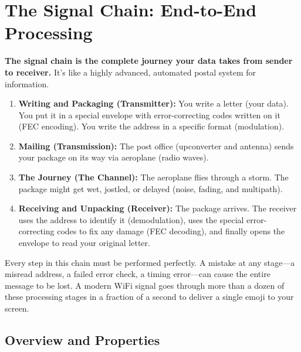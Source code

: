 
\chapter{The Signal Chain: End-to-End Processing}
\label{ch:signal-chain}

\begin{nontechnical}
    \textbf{The signal chain is the complete journey your data takes from sender to receiver.} It's like a highly advanced, automated postal system for information.

    \begin{enumerate}
        \item \textbf{Writing and Packaging (Transmitter):} You write a letter (your data). You put it in a special envelope with error-correcting codes written on it (FEC encoding). You write the address in a specific format (modulation).
        \item \textbf{Mailing (Transmission):} The post office (upconverter and antenna) sends your package on its way via aeroplane (radio waves).
        \item \textbf{The Journey (The Channel):} The aeroplane flies through a storm. The package might get wet, jostled, or delayed (noise, fading, and multipath).
        \item \textbf{Receiving and Unpacking (Receiver):} The package arrives. The receiver uses the address to identify it (demodulation), uses the special error-correcting codes to fix any damage (FEC decoding), and finally opens the envelope to read your original letter.
    \end{enumerate}
    
     Every step in this chain must be performed perfectly. A mistake at any stage—a misread address, a failed error check, a timing error—can cause the entire message to be lost. A modern WiFi signal goes through more than a dozen of these processing stages in a fraction of a second to deliver a single emoji to your screen.
\end{nontechnical}


\section{Overview and Properties}

